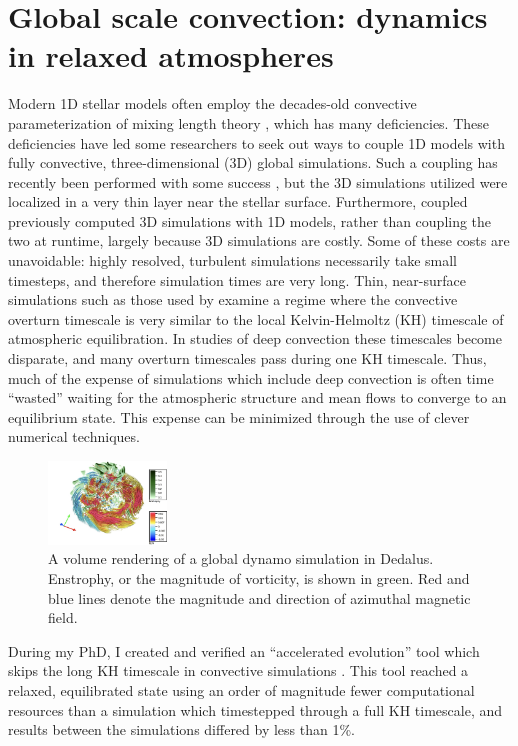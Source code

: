 \documentclass[11pt, preprint]{aastex}
\begin{document}
\section{Global scale convection: dynamics in relaxed atmospheres}
\vspace{-8pt}
Modern 1D stellar models often employ the decades-old convective parameterization of mixing length theory \citep{bohm-vitense1958}, which has many deficiencies.
These deficiencies have led some researchers to seek out ways to couple 1D models with fully convective, three-dimensional (3D) global simulations.
Such a coupling has recently been performed with some success \citep{jorgensen&weiss2019}, but the 3D simulations utilized were localized in a very thin layer near the stellar surface.
Furthermore, \citet{jorgensen&weiss2019} coupled previously computed 3D simulations with 1D models, rather than coupling the two at runtime, largely because 3D simulations are costly.
Some of these costs are unavoidable: highly resolved, turbulent simulations necessarily take small timesteps, and therefore simulation times are very long.
Thin, near-surface simulations such as those used by \citet{jorgensen&weiss2019} examine a regime where the convective overturn timescale is very similar to the local Kelvin-Helmoltz (KH) timescale of atmospheric equilibration.
In studies of deep convection these timescales become disparate, and many overturn timescales pass during one KH timescale.
Thus, much of the expense of simulations which include deep convection is often time ``wasted'' waiting for the atmospheric structure and mean flows to converge to an equilibrium state.
This expense can be minimized through the use of clever numerical techniques.

\begin{figure}
	\begin{center}
	\vspace{-10pt}
    \includegraphics[width=0.28\textwidth]{./figs/mdwarf.png}
	\vspace{-16pt}
	\end{center}
    \caption{A volume rendering of a global dynamo simulation in Dedalus.
	Enstrophy, or the magnitude of vorticity, is shown in green.
	Red and blue lines denote the magnitude and direction of azimuthal magnetic field.
	\label{fig:mdwarf} }
\end{figure}
During my PhD, I created and verified an ``accelerated evolution'' tool which skips the long KH timescale in convective simulations \citep{anders&all2018}.
This tool reached a relaxed, equilibrated state using an order of magnitude fewer computational resources than a simulation which timestepped through a full KH timescale, and results between the simulations differed by less than 1\%.
\end{document}
